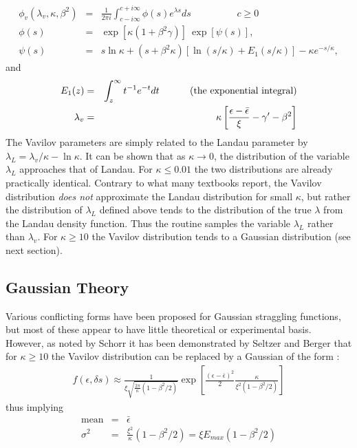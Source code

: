\begin{eqnarray*}
\phi_{v} \left ( \lambda_{v}, \kappa, \beta^{2} \right ) & = &
\frac{1}{2 \pi i} \int^{c+i\infty}_{c-i\infty}\phi \left( s \right ) 
e^{\lambda s} ds \hspace{2cm} c \geq 0 \\
\phi \left ( s \right ) & = & 
\exp \left [ \kappa ( 1 + \beta^{2}\gamma ) \right ]
~ \exp \left [ \psi \left ( s \right ) \right ], \\
\psi \left ( s \right )  & = & s \ln \kappa + ( s + \beta^{2} \kappa )
\left [ \ln (s/\kappa) + E_{1} (s/\kappa) \right ] - \kappa e^{-s/\kappa}, 
\end{eqnarray*}
and
\begin{eqnarray*}
E_{1}(z) & = & \int^{\infty}_{z} t^{-1} e^{-t} dt 
\mbox{\hspace{1cm} (the exponential integral)} \\
\lambda_v & = & \kappa \left [ \frac{\epsilon - \bar{\epsilon}}{\xi}
- \gamma' - \beta^2 \right]
\end{eqnarray*}
The Vavilov parameters are simply related to the Landau parameter
by $\lambda_L = \lambda_v/\kappa - \ln\kappa $. It can be shown that 
as $\kappa \rightarrow 0$, the distribution of the variable $\lambda_L$ 
approaches that of Landau. For $\kappa \leq 0.01$ the two distributions
are already practically identical. Contrary
to what many textbooks report, the Vavilov distribution {\em
does not} approximate the Landau distribution for small $\kappa$, 
but rather the distribution of
$\lambda_L$ defined above tends to the distribution of the
true $\lambda$ from the Landau density function. 
Thus the routine  samples the 
variable $\lambda_L$ rather than $\lambda_v$. 
For $\kappa \geq 10$ the Vavilov distribution tends to a
Gaussian distribution (see next section).
 
\subsection{Gaussian Theory}
 
Various conflicting forms have been proposed for Gaussian straggling
functions, but most of these appear to have little theoretical or
experimental basis.
However, as noted by Schorr \cite{bib-SCH1} it has been demonstrated 
by Seltzer and Berger \cite{bib-SELT}
that for $\kappa \geq 10 $ 
the Vavilov distribution can be replaced by a Gaussian of the form :
\begin{eqnarray*}
f( \epsilon , \delta s)  \approx \frac{1}
{\xi \sqrt{\frac{2 \pi}{\kappa} \left( 1 - \beta^2/2 \right)}}
   \exp \left [ \frac{( \epsilon - \bar{\epsilon} )^2}{2} \frac{\kappa}
   {\xi^2 (1- \beta^2/2)}\right ]
\end{eqnarray*}
thus implying 
\begin{eqnarray*}
\mbox{mean} & = & \bar{\epsilon} \\
\sigma^2   & = & \frac{\xi^2}{\kappa} (1-\beta^2/2) = \xi E_{max} (1-\beta^2/2)
\end{eqnarray*}

